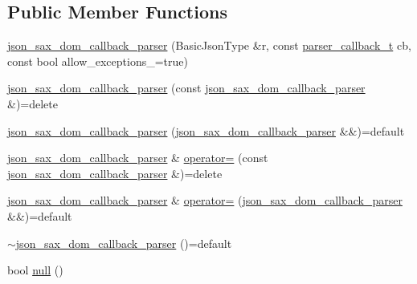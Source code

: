 \subsection*{Public Member Functions}
\begin{DoxyCompactItemize}
\item 
\hyperlink{classnlohmann_1_1detail_1_1json__sax__dom__callback__parser_afec9434e54590f10df51b062973d4daf}{json\+\_\+sax\+\_\+dom\+\_\+callback\+\_\+parser} (Basic\+Json\+Type \&r, const \hyperlink{classnlohmann_1_1detail_1_1json__sax__dom__callback__parser_a4f636086fa8e7cf26c35c8afd50903ce}{parser\+\_\+callback\+\_\+t} cb, const bool allow\+\_\+exceptions\+\_\+=true)
\item 
\hyperlink{classnlohmann_1_1detail_1_1json__sax__dom__callback__parser_a589998730e650a425b1b311e2e9f7f09}{json\+\_\+sax\+\_\+dom\+\_\+callback\+\_\+parser} (const \hyperlink{classnlohmann_1_1detail_1_1json__sax__dom__callback__parser}{json\+\_\+sax\+\_\+dom\+\_\+callback\+\_\+parser} \&)=delete
\item 
\hyperlink{classnlohmann_1_1detail_1_1json__sax__dom__callback__parser_af1ce6c746e3ebadb7994170725fcdbb5}{json\+\_\+sax\+\_\+dom\+\_\+callback\+\_\+parser} (\hyperlink{classnlohmann_1_1detail_1_1json__sax__dom__callback__parser}{json\+\_\+sax\+\_\+dom\+\_\+callback\+\_\+parser} \&\&)=default
\item 
\hyperlink{classnlohmann_1_1detail_1_1json__sax__dom__callback__parser}{json\+\_\+sax\+\_\+dom\+\_\+callback\+\_\+parser} \& \hyperlink{classnlohmann_1_1detail_1_1json__sax__dom__callback__parser_a5c9603e79a71713f5e8cf12cba837dbb}{operator=} (const \hyperlink{classnlohmann_1_1detail_1_1json__sax__dom__callback__parser}{json\+\_\+sax\+\_\+dom\+\_\+callback\+\_\+parser} \&)=delete
\item 
\hyperlink{classnlohmann_1_1detail_1_1json__sax__dom__callback__parser}{json\+\_\+sax\+\_\+dom\+\_\+callback\+\_\+parser} \& \hyperlink{classnlohmann_1_1detail_1_1json__sax__dom__callback__parser_a60753ffbec958de15de807852e62cde8}{operator=} (\hyperlink{classnlohmann_1_1detail_1_1json__sax__dom__callback__parser}{json\+\_\+sax\+\_\+dom\+\_\+callback\+\_\+parser} \&\&)=default
\item 
\hyperlink{classnlohmann_1_1detail_1_1json__sax__dom__callback__parser_a54ffcdfb0a8c5c9a876cd003b404ef4b}{$\sim$json\+\_\+sax\+\_\+dom\+\_\+callback\+\_\+parser} ()=default
\item 
bool \hyperlink{classnlohmann_1_1detail_1_1json__sax__dom__callback__parser_a446262b6a75371fe8e0a6218ba2911e6}{null} ()

\end{DoxyCompactItemize}
